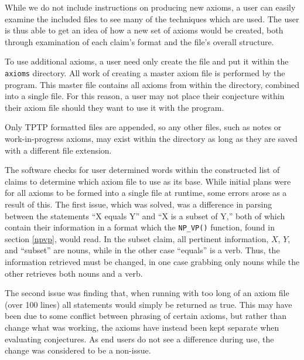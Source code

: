 While we do not include instructions on producing new axioms, a user can easily examine the included files to see many of the techniques which are used. The user is thus able to get an idea of how a new set of axioms would be created, both through examination of each claim's format and the file's overall structure.

To use additional axioms, a user need only create the file and put it within the \texttt{axioms} directory. All work of creating a master axiom file is performed by the program. This master file contains all axioms from within the directory, combined into a single file. For this reason, a user may not place their conjecture within their axiom file should they want to use it with the program.

Only TPTP formatted files are appended, so any other files, such as notes or work-in-progress axioms, may exist within the directory as long as they are saved with a different file extension.

The software checks for user determined words within the constructed list of claims to determine which axiom file to use as its base. While initial plans were for all axioms to be formed into a single file at runtime, some errors arose as a result of this. The first issue, which was solved, was a difference in parsing between the statements ``X equals Y'' and ``X is a subset of Y,'' both of which contain their information in a format which the \texttt{NP\_VP()} function, found in section \ref{npvp}, would read. In the subset claim, all pertinent information, $X$, $Y$, and ``subset'' are nouns, while in the other case ``equals'' is a verb. Thus, the information retrieved must be changed, in one case grabbing only nouns while the other retrieves both nouns and a verb.

The second issue was finding that, when running with too long of an axiom file (over 100 lines) all statements would simply be returned as true. This may have been due to some conflict between phrasing of certain axioms, but rather than change what was working, the axioms have instead been kept separate when evaluating conjectures. As end users do not see a difference during use, the change was considered to be a non-issue.
